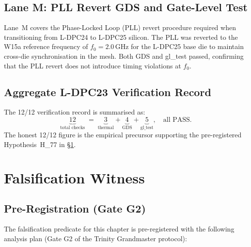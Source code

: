 \subsection{Lane M: PLL Revert GDS and Gate-Level Test}

Lane~M covers the Phase-Locked Loop (PLL) revert procedure required when
transitioning from L-DPC24 to L-DPC25 silicon.
The PLL was reverted to the W15a reference frequency of $f_0 = 2.0\,\text{GHz}$
for the L-DPC25 base die to maintain cross-die synchronisation in the mesh.
Both GDS and gl\_test passed, confirming that the PLL revert does not
introduce timing violations at $f_0$.

\subsection{Aggregate L-DPC23 Verification Record}

The 12/12 verification record is summarised as:
%
\begin{equation}
  \label{eq:ldpc23-record}
  \underbrace{12}_{\text{total checks}} \;=\;
  \underbrace{3}_{\text{thermal}} +
  \underbrace{4}_{\text{GDS}} +
  \underbrace{5}_{\text{gl\_test}},
  \quad \text{all PASS}.
\end{equation}
%
The honest 12/12 figure is the empirical precursor supporting
the pre-registered Hypothesis~H\_77 in §\ref{sec:flos77-falsification}.

\section{Falsification Witness}
\label{sec:flos77-falsification}

\subsection{Pre-Registration (Gate G2)}

The falsification predicate for this chapter is pre-registered with the
following analysis plan (Gate G2 of the Trinity Grandmaster protocol):

